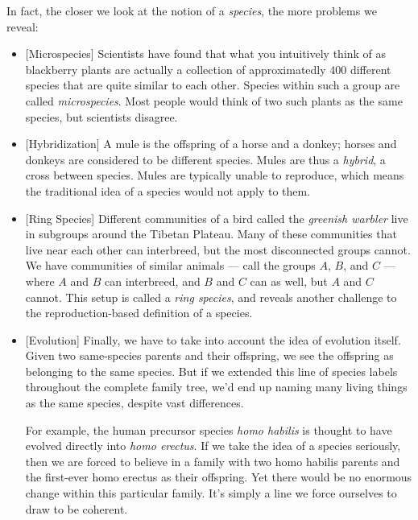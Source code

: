 \documentclass[11pt, oneside]{article}   	%
\begin{document}
In fact, the closer we look at the notion of a {\em species}, the more problems
we reveal:
\begin{itemize}
    \item{} [Microspecies] Scientists have found that what you intuitively
        think of as blackberry plants are actually a
        collection of approximatedly 400
        different species that are quite similar to each other.
        Species within such a group are called {\em microspecies}.
        Most people would think of two such plants as the same species,
        but scientists disagree.
    \item{} [Hybridization] A mule is the offspring of a horse and a donkey;
        horses and donkeys are considered to be different species.
        Mules are thus a {\em hybrid}, a cross between species.
        Mules
        are typically unable to reproduce, which means the
        traditional idea of a species would not apply to them.
    \item{} [Ring Species] Different communities of a bird called the
        {\em greenish warbler} live in subgroups around the Tibetan Plateau.
        Many of these communities that live near each other can interbreed, but
        the most disconnected groups cannot. We have
        communities of similar animals --- call the groups $A$, $B$, and $C$ ---
        where $A$ and $B$ can interbreed, and $B$ and $C$ can as well, but $A$
        and $C$ cannot. This setup is called a {\em ring species}, and reveals
        another challenge to the reproduction-based definition of a species.
    \item{} [Evolution] Finally, we have to take into account the idea of
        evolution itself.
        Given two same-species parents and their offspring, we see the
        offspring as belonging to the same species.
        But if we extended this line of
        species labels throughout the complete family tree, we'd end up naming
        many living things as the same species, despite vast differences.

        For example, the human precursor species {\em homo habilis} is
        thought to have evolved directly into {\em homo erectus}.
        If we take the idea of a species seriously,
        then we are forced to believe in a family
        with two homo habilis parents and
        the first-ever homo erectus as their offspring.
        Yet there would be no enormous
        change within this particular family.
        It's simply a line we force
        ourselves to draw to be coherent.
\end{itemize}
\end{document}
